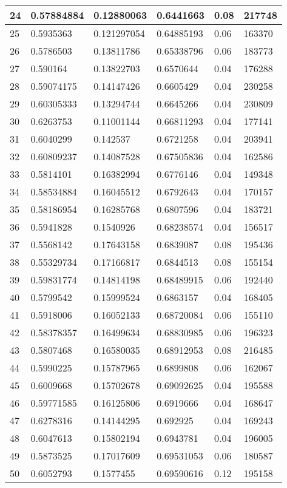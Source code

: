 \begin{longtable}{|l|l|l|l|l|l|}
24 & 0.57884884 & 0.12880063 & 0.6441663 & 0.08 & 217748 \\ \hline 
25 & 0.5935363 & 0.121297054 & 0.64885193 & 0.06 & 163370 \\ \hline 
26 & 0.5786503 & 0.13811786 & 0.65338796 & 0.06 & 183773 \\ \hline 
27 & 0.590164 & 0.13822703 & 0.6570644 & 0.04 & 176288 \\ \hline 
28 & 0.59074175 & 0.14147426 & 0.6605429 & 0.04 & 230258 \\ \hline 
29 & 0.60305333 & 0.13294744 & 0.6645266 & 0.04 & 230809 \\ \hline 
30 & 0.6263753 & 0.11001144 & 0.66811293 & 0.04 & 177141 \\ \hline 
31 & 0.6040299 & 0.142537 & 0.6721258 & 0.04 & 203941 \\ \hline 
32 & 0.60809237 & 0.14087528 & 0.67505836 & 0.04 & 162586 \\ \hline 
33 & 0.5814101 & 0.16382994 & 0.6776146 & 0.04 & 149348 \\ \hline 
34 & 0.58534884 & 0.16045512 & 0.6792643 & 0.04 & 170157 \\ \hline 
35 & 0.58186954 & 0.16285768 & 0.6807596 & 0.04 & 183721 \\ \hline 
36 & 0.5941828 & 0.1540926 & 0.68238574 & 0.04 & 156517 \\ \hline 
37 & 0.5568142 & 0.17643158 & 0.6839087 & 0.08 & 195436 \\ \hline 
38 & 0.55329734 & 0.17166817 & 0.6844513 & 0.08 & 155154 \\ \hline 
39 & 0.59831774 & 0.14814198 & 0.68489915 & 0.06 & 192440 \\ \hline 
40 & 0.5799542 & 0.15999524 & 0.6863157 & 0.04 & 168405 \\ \hline 
41 & 0.5918006 & 0.16052133 & 0.68720084 & 0.06 & 155110 \\ \hline 
42 & 0.58378357 & 0.16499634 & 0.68830985 & 0.06 & 196323 \\ \hline 
43 & 0.5807468 & 0.16580035 & 0.68912953 & 0.08 & 216485 \\ \hline 
44 & 0.5990225 & 0.15787965 & 0.6899808 & 0.06 & 162067 \\ \hline 
45 & 0.6009668 & 0.15702678 & 0.69092625 & 0.04 & 195588 \\ \hline 
46 & 0.59771585 & 0.16125806 & 0.6919666 & 0.04 & 168647 \\ \hline 
47 & 0.6278316 & 0.14144295 & 0.692925 & 0.04 & 169243 \\ \hline 
48 & 0.6047613 & 0.15802194 & 0.6943781 & 0.04 & 196005 \\ \hline 
49 & 0.5873525 & 0.17017609 & 0.69531053 & 0.06 & 180587 \\ \hline 
50 & 0.6052793 & 0.1577455 & 0.69590616 & 0.12 & 195158 \\ \hline 
\end{longtable}